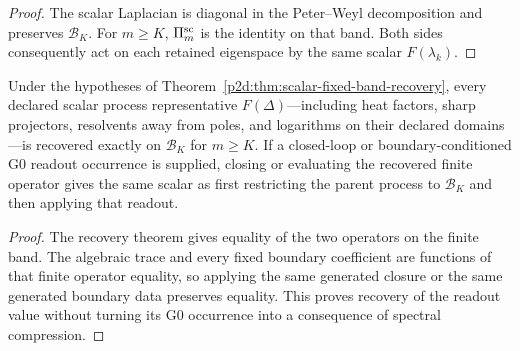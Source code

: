 \documentclass[12pt,a4paper]{article}
\begin{document}
\begin{proof}
The scalar Laplacian is diagonal in the Peter--Weyl decomposition and preserves
\(\mathcal B_K\).  For \(m\ge K\), \(\Pi_m^{\rm sc}\) is the identity on
that band.  Both sides consequently act on each retained eigenspace by the
same scalar \(F(\lambda_k)\).
\end{proof}

\begin{corollary}
\label{p2d:cor:fixed-band-process-readout-recovery}
Under the hypotheses of
Theorem~\ref{p2d:thm:scalar-fixed-band-recovery}, every declared scalar
process representative \(F(\Delta)\)---including heat factors, sharp
projectors, resolvents away from poles, and logarithms on their declared
domains---is recovered exactly on \(\mathcal B_K\) for \(m\ge K\).  If a
closed-loop or boundary-conditioned G0 readout occurrence is supplied, closing
or evaluating the recovered finite operator gives the same scalar as first
restricting the parent process to \(\mathcal B_K\) and then applying that
readout.
\end{corollary}

\begin{proof}
The recovery theorem gives equality of the two operators on the finite band.
The algebraic trace and every fixed boundary coefficient are functions of that
finite operator equality, so applying the same generated closure or the same
generated boundary data preserves equality.  This proves recovery of the
readout value without turning its G0 occurrence into a consequence of spectral
compression.
\end{proof}
\end{document}
